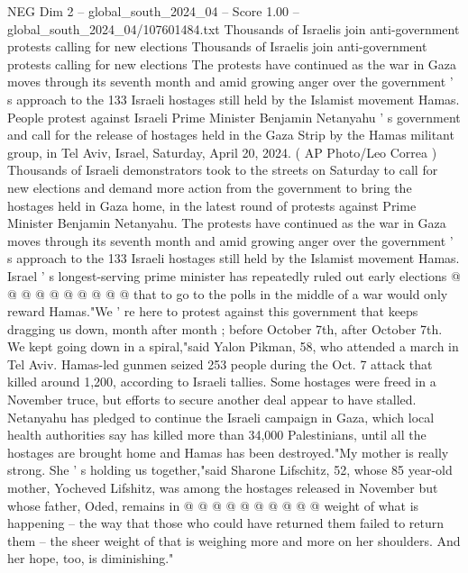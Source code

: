 \begin{textsample}{NEG Dim 2 – global\_south\_2024\_04 – Score 1.00 – global\_south\_2024\_04/107601484.txt}  \label{ex:f2_neg_297}
Thousands of Israelis join anti-government protests calling for new elections Thousands of Israelis join anti-government protests calling for new elections The protests have continued as the war in Gaza moves through its seventh month and amid growing anger over the government ' s approach to the 133 Israeli hostages still held by the Islamist movement Hamas.
People protest against Israeli Prime Minister Benjamin Netanyahu ' s government and call for the release of hostages held in the Gaza Strip by the Hamas militant group, in Tel Aviv, Israel, Saturday, April 20, 2024. ( AP Photo/Leo Correa ) Thousands of Israeli demonstrators took to the streets on Saturday to call for new elections and demand more action from the government to bring the hostages held in Gaza home, in the latest round of protests against Prime Minister Benjamin Netanyahu.
The protests have continued as the war in Gaza moves through its seventh month and amid growing anger over the government ' s approach to the 133 Israeli hostages still held by the Islamist movement Hamas.
Israel ' s longest-serving prime minister has repeatedly ruled out early elections @ @ @ @ @ @ @ @ @ @ that to go to the polls in the middle of a war would only reward Hamas."We ' re here to protest against this government that keeps dragging us down, month after month ; before October 7th, after October 7th.
We kept going down in a spiral,"said Yalon Pikman, 58, who attended a march in Tel Aviv.
Hamas-led gunmen seized 253 people during the Oct. 7 attack that killed around 1,200, according to Israeli tallies.
Some hostages were freed in a November truce, but efforts to secure another deal appear to have stalled.
Netanyahu has pledged to continue the Israeli campaign in Gaza, which local health authorities say has killed more than 34,000 Palestinians, until all the hostages are brought home and Hamas has been destroyed."My mother is really strong.
She ' s holding us together,"said Sharone Lifschitz, 52, whose 85 year-old mother, Yocheved Lifshitz, was among the hostages released in November but whose father, Oded, remains in @ @ @ @ @ @ @ @ @ @ weight of what is happening -- the way that those who could have returned them failed to return them -- the sheer weight of that is weighing more and more on her shoulders.
And her hope, too, is diminishing."

\end{textsample}
